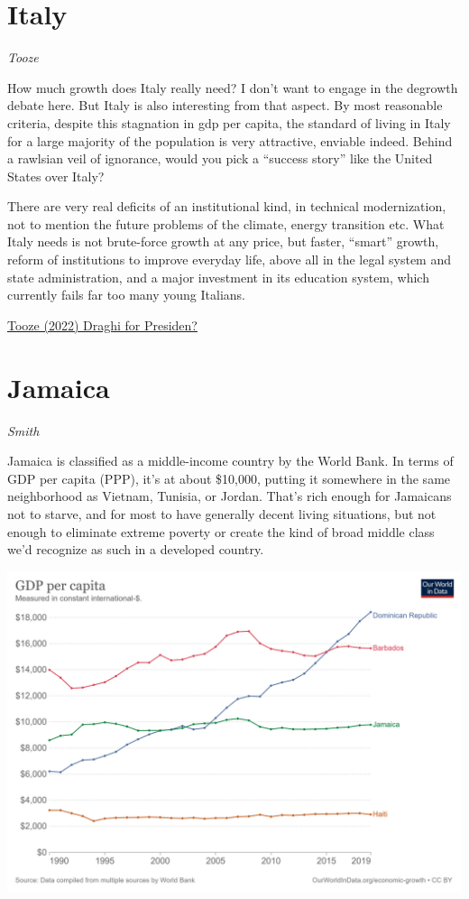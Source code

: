 \documentclass[
]{book}
\begin{document}
\hypertarget{italy}{%
\section{Italy}\label{italy}}

\emph{Tooze}

How much growth does Italy really need? I don't want to engage in the degrowth debate here. But Italy is also interesting from that aspect. By most reasonable criteria, despite this stagnation in gdp per capita, the standard of living in Italy for a large majority of the population is very attractive, enviable indeed. Behind a rawlsian veil of ignorance, would you pick a ``success story'' like the United States over Italy?

There are very real deficits of an institutional kind, in technical modernization, not to mention the future problems of the climate, energy transition etc. What Italy needs is not brute-force growth at any price, but faster, ``smart'' growth, reform of institutions to improve everyday life, above all in the legal system and state administration, and a major investment in its education system, which currently fails far too many young Italians.

\href{https://adamtooze.substack.com/p/chartbook-70-draghi-for-president}{Tooze (2022) Draghi for Presiden?}

\hypertarget{jamaica}{%
\section{Jamaica}\label{jamaica}}

\emph{Smith}

Jamaica is classified as a middle-income country by the World Bank. In terms of GDP per capita (PPP), it's at about \$10,000, putting it somewhere in the same neighborhood as Vietnam, Tunisia, or Jordan. That's rich enough for Jamaicans not to starve, and for most to have generally decent living situations, but not enough to eliminate extreme poverty or create the kind of broad middle class we'd recognize as such in a developed country.

\includegraphics{fig/Jamaica.png}
\end{document}
